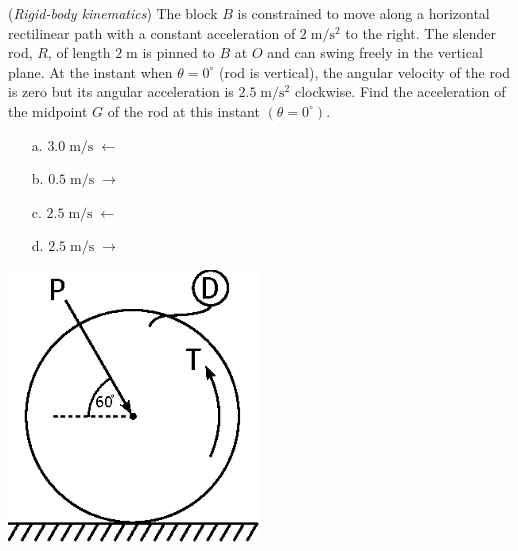 \documentclass[addpoints, 12pt]{exam}
\begin{document}
\begin{questions}
\begin{minipage}{0.5\textwidth}
\question(\textit{Rigid-body kinematics})
The block $B$ is constrained to move along a horizontal rectilinear path with a 
constant acceleration of $2\; \unit{\meter\per\second\squared}$ to the right. 
The slender rod, $R$, of length $2\; \unit{\meter}$ is pinned to $B$ at $O$ and 
can swing freely in the vertical plane. At the instant when $\theta = 0^\circ$ 
(rod is vertical), the angular velocity of the rod is zero but its angular 
acceleration is $2.5 \; \unit{\meter\per\second\squared}$ clockwise. Find the 
acceleration of the midpoint $G$ of the rod at this instant $(\theta =
0^\circ)$. \\[0.5ex]

\begin{minipage}{0.45\textwidth}
    \begin{center}
    \begin{itemize}
        \setlength\itemsep{-0.4em}
        \item[a.] $3.0 \; \unit{\meter\per\second} \; \leftarrow$
        \item[b.] $0.5 \; \unit{\meter\per\second} \; \rightarrow$
    \end{itemize}
    \end{center}
\end{minipage}
\begin{minipage}{0.45\textwidth}
    \begin{center}
    \begin{itemize}
        \setlength\itemsep{-0.4em}
        \item[c.] $2.5 \; \unit{\meter\per\second} \; \leftarrow$
        \item[d.] $2.5 \; \unit{\meter\per\second} \; \rightarrow$
    \end{itemize}
    \end{center}
\end{minipage}

\end{minipage}
%
\begin{minipage}{0.5\textwidth}
    \centering
    \includegraphics[width=0.5\textwidth,valign=c]{./figures/question6.eps}
\end{minipage}



\end{questions}
\end{document}

